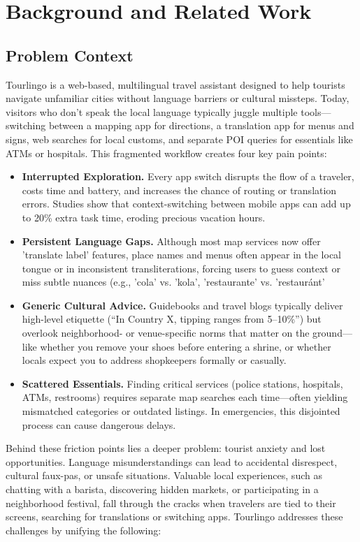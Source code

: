 \chapter{Background and Related Work}

\section{Problem Context}
Tourlingo is a web-based, multilingual travel assistant designed to help tourists navigate unfamiliar cities without language barriers or cultural missteps. Today, visitors who don’t speak the local language typically juggle multiple tools—switching between a mapping app for directions, a translation app for menus and signs, web searches for local customs, and separate POI queries for essentials like ATMs or hospitals. This fragmented workflow creates four key pain points:

\begin{itemize}
  \item \textbf{Interrupted Exploration.} Every app switch disrupts the flow of a traveler, costs time and battery, and increases the chance of routing or translation errors. Studies show that context-switching between mobile apps can add up to 20\% extra task time, eroding precious vacation hours.
  \item \textbf{Persistent Language Gaps.} Although most map services now offer 'translate label' features, place names and menus often appear in the local tongue or in inconsistent transliterations, forcing users to guess context or miss subtle nuances (e.g., 'cola' vs. 'kola', 'restaurante' vs. 'restauránt'
  \item \textbf{Generic Cultural Advice.} Guidebooks and travel blogs typically deliver high-level etiquette (“In Country X, tipping ranges from 5–10\%”) but overlook neighborhood- or venue-specific norms that matter on the ground—like whether you remove your shoes before entering a shrine, or whether locals expect you to address shopkeepers formally or casually.
  \item \textbf{Scattered Essentials.} Finding critical services (police stations, hospitals, ATMs, restrooms) requires separate map searches each time—often yielding mismatched categories or outdated listings. In emergencies, this disjointed process can cause dangerous delays.
\end{itemize}

Behind these friction points lies a deeper problem: tourist anxiety and lost opportunities. Language misunderstandings can lead to accidental disrespect, cultural faux-pas, or unsafe situations. Valuable local experiences, such as chatting with a barista, discovering hidden markets, or participating in a neighborhood festival, fall through the cracks when travelers are tied to their screens, searching for translations or switching apps. Tourlingo addresses these challenges by unifying the following:


